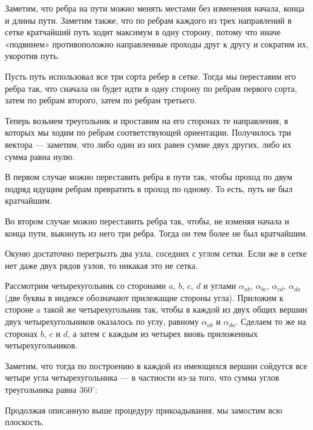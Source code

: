 ﻿
\begin{itemize}

\itA Заметим, что ребра на пути можно менять местами без изменения начала, конца и длины пути. Заметим также, что по ребрам каждого из трех направлений в сетке кратчайший путь ходит максимум в одну сторону, потому что иначе «подвинем» противоположно направленные проходы друг к другу и сократим их, укоротив путь.

Пусть путь использовал все три сорта ребер в сетке. Тогда мы переставим его ребра так, что сначала он будет идти в одну сторону по ребрам первого сорта, затем по ребрам второго, затем по ребрам третьего.

Теперь возьмем треугольник и проставим на его сторонах те направления, в которых мы ходим по ребрам соответствующей ориентации. Получилось три вектора — заметим, что либо один из них равен сумме двух других, либо их сумма равна нулю.

В первом случае можно переставить ребра в пути так, чтобы проход по двум подряд идущим ребрам превратить в проход по одному. То есть, путь не был кратчайшим.

Во втором случае можно переставить ребра так, чтобы, не изменяя начала и конца пути, выкинуть из него три ребра. Тогда он тем более не был кратчайшим.

\itB Окуню достаточно перегрызть два узла, соседних с углом сетки. Если же в сетке нет даже двух рядов узлов, то никакая это не сетка.

\itC Рассмотрим четырехугольник со сторонами $a$, $b$, $c$, $d$ и углами $\alpha_{ab}$, $\alpha_{bc}$, $\alpha_{cd}$, $\alpha_{da}$ (две буквы в индексе обозначают прилежащие стороны угла). Приложим к стороне $a$ такой же четырехугольник так, чтобы в каждой из двух общих вершин двух четырехугольников оказалось по углу, равному $\alpha_{ab}$ и $\alpha_{da}$. Сделаем то же на сторонах $b$, $c$ и $d$, а затем с каждым из четырех вновь приложенных четырехугольников.

Заметим, что тогда по построению в каждой из имеющихся вершин сойдутся все четыре угла четырехугольника — в частности из-за того, что сумма углов треугольника равна $360^\circ$:

\begin{center}  \end{center}

Продолжая описанную выше процедуру прикоадывания, мы замостим всю плоскость.
\end{itemize}